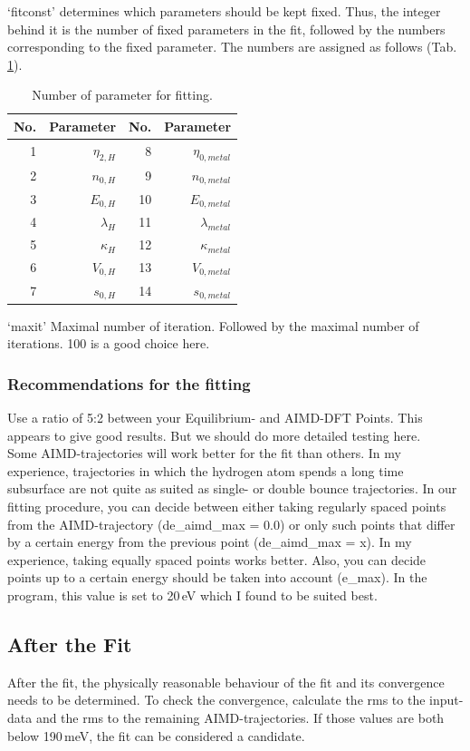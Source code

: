 \documentclass[11pt,oneside,a4paper, captions=nooneline, headsepline]{article}%
\begin{document}
`fitconst' determines which parameters should be kept fixed. Thus, the integer behind it is the number of fixed parameters in the fit, followed by the numbers corresponding to the fixed parameter. The numbers are assigned as follows (Tab.\,\ref{nopar}).\\
\begin{table}[h!]
\centering
\caption{Number of parameter for fitting.}
\label{nopar}
\begin{tabular}{rrrr}
\hline\hline
No.&Parameter&No.&Parameter\\
\hline
1&$\eta_{2,H}$	&8&$\eta_{0,metal}$\\
2&$n_{0,H}$		&9&$n_{0,metal}$\\
3&$E_{0,H}$		&10&$E_{0,metal}$\\
4&$\lambda_{H}$	&11&$\lambda_{metal}$\\
5&$\kappa_{H}$	&12&$\kappa_{metal}$\\
6&$V_{0,H}$		&13&$V_{0,metal}$\\
7&$s_{0,H}$		&14&$s_{0,metal}$\\
\hline\hline
\end{tabular}
\end{table}
`maxit' Maximal number of iteration. Followed by the maximal number of iterations. 100 is a good choice here.\\
\subsubsection*{Recommendations for the fitting}
Use a ratio of 5:2 between your Equilibrium- and AIMD-DFT Points. This appears to give good results. But we should do more detailed testing here.\\
Some AIMD-trajectories will work better for the fit than others. In my experience, trajectories in which the hydrogen atom spends a long time subsurface are not quite as suited as single- or double bounce trajectories. In our fitting procedure, you can decide between either taking regularly spaced points from the AIMD-trajectory (de\_aimd\_max = 0.0) or only such points that differ by a certain energy from the previous point (de\_aimd\_max = x). In my experience, taking equally spaced points works better. Also, you can decide points up to a certain energy should be taken into account (e\_max). In the program, this value is set to 20\,eV which I found to be suited best.
\subsection{After the Fit}
After the fit, the physically reasonable behaviour of the fit and its convergence needs to be determined. To check the convergence, calculate the rms to the input-data and the rms to the remaining AIMD-trajectories. If those values are both below 190\,meV, the fit can be considered a candidate.
\end{document}
